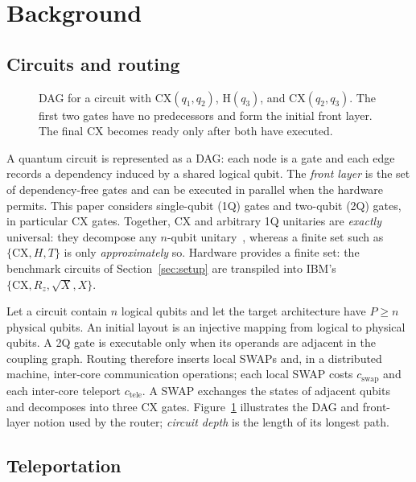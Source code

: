 \documentclass[journal]{IEEEtran}
\begin{document}
\section{Background}
\label{sec:background}

\subsection{Circuits and routing}
\label{sec:qcircuits}

\begin{figure}[t]
\centering

\caption{DAG for a circuit with $\mathrm{CX}(q_1,q_2)$,
$\mathrm{H}(q_3)$, and $\mathrm{CX}(q_2,q_3)$. The first two gates have no
predecessors and form the initial front layer. The final CX becomes ready only
after both have executed.}
\label{fig:dag-example}
\end{figure}

A quantum circuit is represented as a DAG: each
node is a gate and each edge records a dependency induced by a shared logical
qubit. The \emph{front layer} is the set of dependency-free gates and can be
executed in parallel when the hardware permits. This paper considers
single-qubit (1Q) gates and two-qubit (2Q) gates, in particular CX gates.
Together, CX and arbitrary 1Q unitaries are \emph{exactly} universal:
they decompose any $n$-qubit unitary~\cite{barenco1995elementary}, whereas a
finite set such as $\{\mathrm{CX},H,T\}$ is only \emph{approximately} so.
Hardware provides a finite set: the benchmark circuits of
Section~\ref{sec:setup} are transpiled into IBM's
$\{\mathrm{CX},R_z,\sqrt{X},X\}$.

Let a circuit contain $n$ logical qubits and let the target architecture have
$P\geq n$ physical qubits. An initial layout is an injective mapping from
logical to physical qubits. A 2Q gate is executable only when its operands
are adjacent in the coupling graph. Routing therefore inserts local SWAPs and,
in a distributed machine, inter-core communication operations; each local SWAP
costs $c_{\mathrm{swap}}$ and each inter-core teleport $c_{\mathrm{tele}}$. A SWAP
exchanges the states of adjacent qubits and decomposes into three CX gates.
Figure~\ref{fig:dag-example} illustrates the DAG and front-layer notion used
by the router; \emph{circuit depth} is the length of its longest path.



\subsection{Teleportation}
\label{sec:teleportation}
\end{document}
